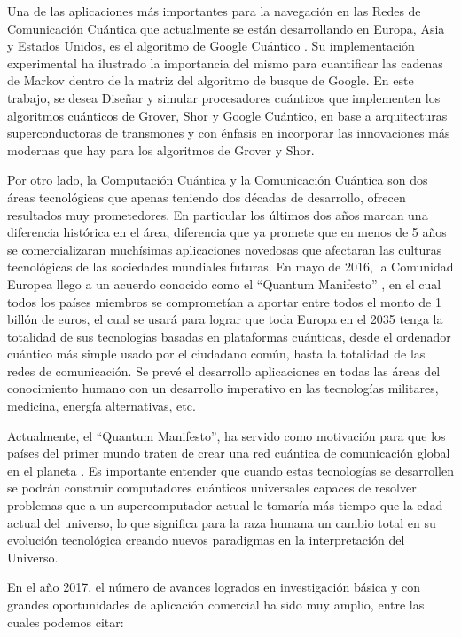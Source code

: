 Una de las aplicaciones más importantes para la navegación en las Redes de Comunicación Cuántica que actualmente se están desarrollando en Europa, Asia y Estados Unidos, es el algoritmo de Google Cuántico \cite{Paparo_2012, Paparo_2014}. Su implementación experimental \cite{Izaac_2017} ha ilustrado la importancia del mismo para cuantificar las cadenas de Markov dentro de la matriz del algoritmo de busque de Google. En este trabajo, se desea Diseñar y simular procesadores cuánticos que implementen los algoritmos cuánticos de Grover, Shor y Google Cuántico, en base a arquitecturas superconductoras de transmones y con énfasis en incorporar las innovaciones más modernas que hay para los algoritmos de Grover y Shor.

Por otro lado, la Computación Cuántica y la Comunicación Cuántica son dos áreas tecnológicas que apenas teniendo dos décadas de desarrollo, ofrecen resultados muy prometedores. En particular los últimos dos años marcan una diferencia histórica en el área, diferencia que ya promete que en menos de 5 años se comercializaran muchísimas aplicaciones novedosas que afectaran las culturas tecnológicas de las sociedades mundiales futuras. En mayo de 2016, la Comunidad Europea llego a un acuerdo conocido como el “Quantum Manifesto” \cite{int34}, en el cual todos los países miembros se comprometían a aportar entre todos el monto de 1 billón de euros, el cual se usará para lograr que toda Europa en el 2035 tenga la totalidad de sus tecnologías basadas en plataformas cuánticas, desde el ordenador cuántico más simple usado por el ciudadano común, hasta la totalidad de las redes de comunicación. Se prevé el desarrollo aplicaciones en todas las áreas del conocimiento humano con un desarrollo imperativo en las tecnologías militares, medicina, energía alternativas, etc.

Actualmente, el “Quantum Manifesto”, ha servido como motivación para que los países del primer mundo traten de crear una red cuántica de comunicación global en el planeta \cite{Simon_2017}. Es importante entender que cuando estas tecnologías se desarrollen se podrán construir computadores cuánticos universales capaces de resolver problemas que a un supercomputador actual le tomaría más tiempo que la edad actual del universo, lo que significa para la raza humana un cambio total en su evolución tecnológica creando nuevos paradigmas en la interpretación del Universo.

En el año 2017, el número de avances logrados en investigación básica y con grandes oportunidades de aplicación comercial ha sido muy amplio, entre las cuales podemos citar:

